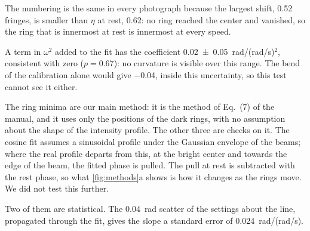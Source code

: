 The numbering is the same in every photograph because the largest shift, \num{0.52} fringes, is smaller than $\eta$ at rest, \num{0.62}: no ring reached the center and vanished, so the ring that is innermost at rest is innermost at every speed.


A term in $\omega^2$ added to the fit has the coefficient \num{0.02 \pm 0.05}~rad/(rad/s)$^2$, consistent with zero ($p = 0.67$): no curvature is visible over this range. The bend of the calibration alone would give \num{-0.04}, inside this uncertainty, so this test cannot see it either.


The ring minima are our main method: it is the method of Eq.~(7) of the manual, and it uses only the positions of the dark rings, with no assumption about the shape of the intensity profile. The other three are checks on it.
The cosine fit assumes a sinusoidal profile under the Gaussian envelope of the beams; where the real profile departs from this, at the bright center and towards the edge of the beam, the fitted phase is pulled. The pull at rest is subtracted with the rest phase, so what \cref{fig:methods}a shows is how it changes as the rings move. We did not test this further.


Two of them are statistical. The \qty{0.04}{\radian} scatter of the settings about the line, propagated through the fit, gives the slope a standard error of \num{0.024}~rad/(rad/s).


